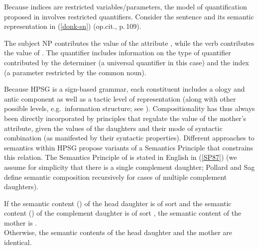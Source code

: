 \documentclass[output=paper
	        ,collection
	        ,collectionchapter
 	        ,biblatex
                ,babelshorthands
                ,newtxmath
                ,draftmode
                ,colorlinks, citecolor=brown
]{langscibook}
\begin{document}
\begin{exe}
\ex\label{donkey}
\end{exe} 

Because indices are restricted variables/parameters,  the model of quantification proposed in \citet[Chapter 4]{PollardandSag1987} involves restricted quantifiers. Consider the sentence  and its semantic representation in (\ref{donk-sn}) (op.cit., p.\,109).

\begin{exe}
\ex\label{donk-sn}


\end{exe}

The subject NP contributes the value of the attribute , while the verb contributes the value of . The quantifier includes information on the type of quantifier contributed by the determiner (a universal quantifier in this case) and the index (a parameter restricted by the common noun).

Because HPSG is a sign-based grammar, each constituent includes a ology and antic component as well as a tactic level of representation (along with other possible levels, e.g.\ information structure; see ). Compositionality has thus always been directly incorporated by principles that regulate the value of the mother's  attribute, given the  values of the daughters and their mode of syntactic combination (as manifested by their syntactic properties). Different approaches to semantics within HPSG  propose variants of a Semantics Principle that constrains this relation. The Semantics Principle of \citet[109]{PollardandSag1987} is stated in English in (\ref{SP87}) (we assume for simplicity that there is a single complement daughter; Pollard and Sag define semantic composition recursively for cases of multiple complement daughters).

\eal \label{SP87}
\ex
If the semantic content () of the head daughter is of sort  and the semantic content () of the complement daughter is of sort , the semantic content of the mother is .\\
\ex Otherwise, the semantic contents of the head daughter and the mother are identical.
\zl
\end{document}
